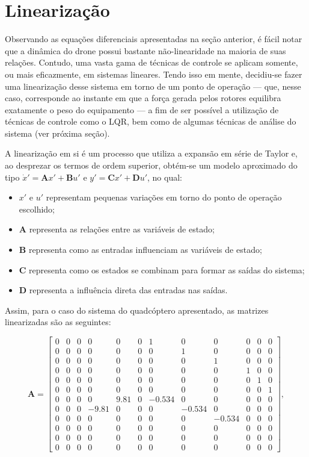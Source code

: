 \section{Linearização \label{sec:linear}}
Observando as equações diferenciais apresentadas na seção anterior, é fácil notar que a dinâmica do drone possui 
bastante não-linearidade na maioria de suas relações. Contudo, uma vasta gama de técnicas de controle se aplicam 
somente, ou mais eficazmente, em sistemas lineares. Tendo isso em mente, decidiu-se fazer uma linearização desse 
sistema em torno de um ponto de operação — que, nesse caso, corresponde ao instante em que a força gerada pelos 
rotores equilibra exatamente o peso do equipamento — a fim de ser possível a utilização de técnicas de controle 
como o LQR, bem como de algumas técnicas de análise do sistema (ver próxima seção).

A linearização em si é um processo que utiliza a expansão em série de Taylor e, ao desprezar os termos de ordem 
superior, obtém-se um modelo aproximado do tipo $\dot{x}' = \mathbf{A} x' + \mathbf{B} u'$ e $y' = \mathbf{C} x' 
+ \mathbf{D} u'$, no qual:

\begin{itemize}
    \item $x'$ e $u'$ representam pequenas variações em torno do ponto de operação escolhido;
    \item $\mathbf{A}$ representa as relações entre as variáveis de estado;
    \item $\mathbf{B}$ representa como as entradas influenciam as variáveis de estado;
    \item $\mathbf{C}$ representa como os estados se combinam para formar as saídas do sistema;
    \item $\mathbf{D}$ representa a influência direta das entradas nas saídas.
\end{itemize}

Assim, para o caso do sistema do quadcóptero apresentado, 
as matrizes linearizadas são as seguintes:

\[
\mathbf{A} =
\left[\begin{array}{cccccccccccc}
0 & 0 & 0 & 0 & 0 & 0 & 1 & 0 & 0 & 0 & 0 & 0 \\
0 & 0 & 0 & 0 & 0 & 0 & 0 & 1 & 0 & 0 & 0 & 0 \\
0 & 0 & 0 & 0 & 0 & 0 & 0 & 0 & 1 & 0 & 0 & 0 \\
0 & 0 & 0 & 0 & 0 & 0 & 0 & 0 & 0 & 1 & 0 & 0 \\
0 & 0 & 0 & 0 & 0 & 0 & 0 & 0 & 0 & 0 & 1 & 0 \\
0 & 0 & 0 & 0 & 0 & 0 & 0 & 0 & 0 & 0 & 0 & 1 \\
0 & 0 & 0 & 0 & 9.81 & 0 & -0.534 & 0 & 0 & 0 & 0 & 0 \\
0 & 0 & 0 & -9.81 & 0 & 0 & 0 & -0.534 & 0 & 0 & 0 & 0 \\
0 & 0 & 0 & 0 & 0 & 0 & 0 & 0 & -0.534 & 0 & 0 & 0 \\
0 & 0 & 0 & 0 & 0 & 0 & 0 & 0 & 0 & 0 & 0 & 0 \\
0 & 0 & 0 & 0 & 0 & 0 & 0 & 0 & 0 & 0 & 0 & 0 \\
0 & 0 & 0 & 0 & 0 & 0 & 0 & 0 & 0 & 0 & 0 & 0
\end{array}\right],
\label{mat:A_lin}
\]

